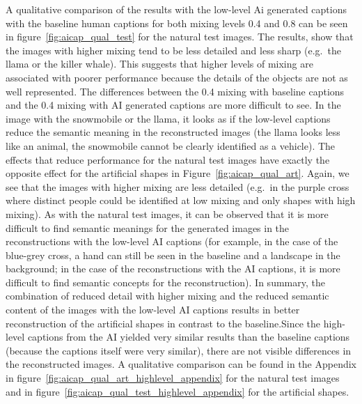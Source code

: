 A qualitative comparison of the results with the low-level Ai generated captions with the baseline human captions for both mixing levels 0.4 and 0.8 can be seen in figure~\ref{fig:aicap_qual_test} for the natural test images. The results, show that the images with higher mixing tend to be less detailed and less sharp (e.g.\ the llama or the killer whale). This suggests that higher levels of mixing are associated with poorer performance because the details of the objects are not as well represented. The differences between the 0.4 mixing with baseline captions and the 0.4 mixing with AI generated captions are more difficult to see. In the image with the snowmobile or the llama, it looks as if the low-level captions reduce the semantic meaning in the reconstructed images (the llama looks less like an animal, the snowmobile cannot be clearly identified as a vehicle). The effects that reduce performance for the natural test images have exactly the opposite effect for the artificial shapes in Figure~\ref{fig:aicap_qual_art}. Again, we see that the images with higher mixing are less detailed (e.g.\ in the purple cross where distinct people could be identified at low mixing and only shapes with high mixing). As with the natural test images, it can be observed that it is more difficult to find semantic meanings for the generated images in the reconstructions with the low-level AI captions (for example, in the case of the blue-grey cross, a hand can still be seen in the baseline and a landscape in the background; in the case of the reconstructions with the AI captions, it is more difficult to find semantic concepts for the reconstruction). In summary, the combination of reduced detail with higher mixing and the reduced semantic content of the images with the low-level AI captions results in better reconstruction of the artificial shapes in contrast to the baseline.Since the high-level captions from the AI yielded very similar results than the baseline captions (because the captions itself were very similar), there are not visible differences in the reconstructed images. A qualitative comparison can be found in the Appendix in figure~\ref{fig:aicap_qual_art_highlevel_appendix} for the natural test images and in figure~\ref{fig:aicap_qual_test_highlevel_appendix} for the artificial shapes.


